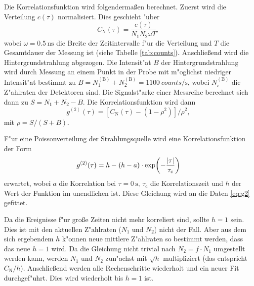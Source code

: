 Die Korrelationsfunktion wird folgenderma\ss en berechnet.
Zuerst wird die Verteilung $c(\tau)$ normalisiert.
Dies geschieht "uber
\begin{equation}
C_\text{N}(\tau)
    =\frac{c(\tau)}{N_1N_2\omega T},
    \label{eq:CN}
\end{equation}
wobei $\omega=\SI{0.5}{\nano\second}$ die Breite der Zeitintervalle f"ur die Verteilung und $T$ die Gesamtdauer der Messung ist (siehe Tabelle \vref{tab:counts}).
Anschlie\ss end wird die Hintergrundstrahlung abgezogen.
Die Intensit"at $B$ der Hintergrundstrahlung wird durch Messung an einem Punkt in der Probe mit m"oglichst niedriger Intensit"at bestimmt zu $B=N_1^{(\text{B})}+N_2^{(\text{B})}=\SI{1100}{counts\per\second}$, wobei $N_i^{(\text{B})}$ die Z"ahlraten der Detektoren sind.
Die Signalst"arke einer Messreihe berechnet sich dann zu $S=N_1+N_2-B$.
Die Korrelationsfunktion wird dann
\begin{equation}
g^{(2)}(\tau)
    =\left[ C_\text{N}(\tau)-(1-\rho^2)\right]/\rho^2,
    \label{eq:g2}
\end{equation}
mit $\rho=S/(S+B)$.

F"ur eine Poissonverteilung der Strahlungsquelle wird eine Korrelationsfunktion der Form
\begin{equation}
g^{(2)}(\tau)
    =h-(h-a)\cdot \exp(-\frac{\abs{\tau}}{\tau_\text{c}})
    \label{eq:fit}
\end{equation}
erwartet, wobei $a$ die Korrelation bei $\tau=\SI{0}{\second}$, $\tau_\text{c}$ die Korrelationszeit und $h$ der Wert der Funktion im unendlichen ist.
Diese Gleichung wird an die Daten \eqref{eq:g2} gefittet.

Da die Ereignisse f"ur gro\ss e Zeiten nicht mehr korreliert sind, sollte $h=1$ sein.
Dies ist mit den aktuellen Z"ahlraten ($N_1$ und $N_2$) nicht der Fall.
Aber aus dem sich ergebendem $h$ k"onnen neue mittlere Z"ahlraten so bestimmt werden, dass das neue $h=1$ wird.
Da die Gleichung nicht trivial nach $N_2=f\cdot N_1$ umgestellt werden kann, werden $N_1$ und $N_2$ zun"achst mit $\sqrt{h}$ multipliziert (das entspricht $C_\text{N}/h$).
Anschlie\ss end werden alle Rechenschritte wiederholt und ein neuer Fit durchgef"uhrt.
Dies wird wiederholt bis $h=1 $ ist.

